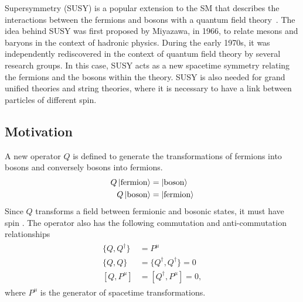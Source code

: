 Supersymmetry (SUSY) is a popular extension to the SM that describes the
interactions between the fermions and bosons with a quantum field
theory~\cite{Miyazawa:1966,PhysRev.170.1586,Volkov:1972jx,Volkov:1973ix,
  Volkov:1973jd,Ramond:1971gb,Golfand:1971iw,Neveu:1971rx,Neveu:1971iv,
  Gervais:1971ji,Wess:1973kz,Wess:1974tw}.
The idea behind SUSY was first proposed by Miyazawa, in 1966, to relate
mesons and baryons in the context of hadronic
physics.
During the early 1970s, it was independently rediscovered in the context of
quantum field theory by several research groups.
In this case, SUSY acts as a new spacetime symmetry relating the fermions and
the bosons within the theory.
SUSY is also needed for grand unified theories and string theories, where it is
necessary to have a link between particles of different spin.

\FloatBarrier
\subsection{Motivation}
\label{sec:susy_motivation}

A new operator $Q$ is defined to generate the transformations of fermions into
bosons and conversely bosons into fermions.
\begin{align}
  \begin{split}
    Q\ket{\mathrm{fermion}} & = \ket{\mathrm{boson}} \\
    Q\ket{\mathrm{boson}}   & = \ket{\mathrm{fermion}}
  \end{split}
\end{align}
Since $Q$ transforms a field between fermionic and bosonic states, it must
have spin .
The operator also has the following commutation and anti-commutation
relationships
\begin{align}
  \begin{split}
    \{Q, Q^{\dagger}\} & = P^{\mu} \\
    \{Q, Q\}           & = \{Q^{\dagger}, Q^{\dagger}\} = 0 \\
    [Q, P^{\mu}]       & = [Q^{\dagger}, P^{\mu}] = 0,
  \end{split}
\end{align}
where $P^{\mu}$ is the generator of spacetime transformations.

